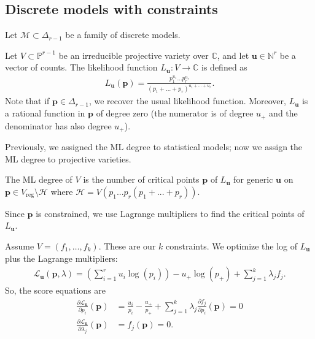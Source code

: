 \subsection{Discrete models with constraints}

Let \( \mathcal{M} \subset \Delta_{r - 1} \) be a family of discrete models.

\begin{defi}
  Let \( V \subset \mathbb P^{r - 1} \) be an irreducible projective variety over \( \mathbb{C} \), and let \( \mathbf u \in \mathbb{N}^r \) be a vector of counts. The likelihood function \( L_\mathbf u: V \to \mathbb{C} \) is defined as
  \begin{align*}
    L_\mathbf u (\mathbf p) = \frac{p_{1}^{u_1} \dots p_r^{u_r}}{(p_1 + \dots + p_r)^{u_1 + \dots + u_r}}.
  \end{align*}
  Note that if \( \mathbf p \in \Delta_{r - 1} \), we recover the usual likelihood function. Moreover, \( L_\mathbf u  \) is a rational function in \( \mathbf p \) of degree zero (the numerator is of degree \( u_+ \) and the denominator has also degree \( u_+ \)).
\end{defi}

Previously, we assigned the ML degree to statistical models; now we assign the ML degree to projective varieties.

\begin{defi}
  The ML degree of \( V \) is the number of critical points \( \mathbf{p} \) of \( L_\mathbf u \) for generic \( \mathbf u \) on \( \mathbf{p} \in V_{\text{reg}} \setminus \mathcal{H} \) where \( \mathcal{H} = V(p_1...p_r(p_1 + ... + p_r)) \). 
\end{defi}

Since \( \mathbf p \) is constrained, we use Lagrange multipliers to find the critical points of \( L_\mathbf u \).

\begin{remark}
  Assume \( V = (f_1, \dots, f_k) \). These are our \( k \) constraints.
  We optimize the log of \( L_\mathbf u \) plus the Lagrange multipliers:
  \begin{align*}
    \mathcal{L}_\mathbf u(\mathbf p, \lambda) = \left(\sum_{i=1}^r u_i \log(p_i)\right) - u_+\log(p_+) + \sum^k_{j=1} \lambda_j f_j.
  \end{align*}
  So, the score equations are 
  \begin{align*}
    \frac{\partial \mathcal{L}_\mathbf u}{\partial p_i}(\mathbf p)  &= \frac{u_i}{p_i} - \frac{u_+}{p_+} + \sum_{j=1}^k \lambda_j \frac{\partial f_j}{\partial p_i}(\mathbf p) = 0 \\
    \frac{\partial \mathcal{L}_\mathbf u}{\partial \lambda_j}(\mathbf p) &= f_j(\mathbf p) = 0.
  \end{align*}
\end{remark}

